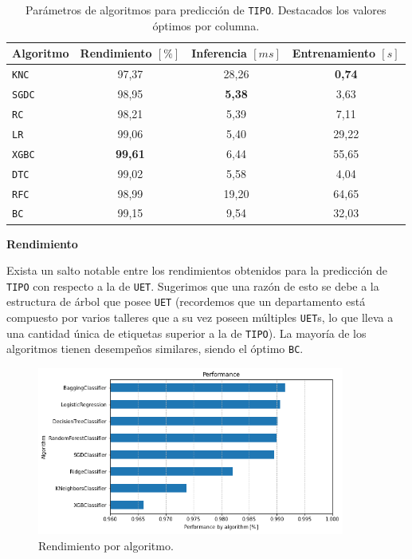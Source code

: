 \documentclass[a4paper,12pt]{article}
\begin{document}
		\begin{table}[H]
			\centering
			\begin{tabular}{lccc}
				\hline
				\multicolumn{1}{c}{\textbf{Algoritmo}} &
				\multicolumn{1}{c}{\textbf{Rendimiento $[\%]$}} &
				\multicolumn{1}{c}{\textbf{Inferencia $[ms]$}} &
				\multicolumn{1}{c}{\textbf{Entrenamiento $[s]$}} \\ 
				\hline
				\texttt{KNC}  & 97,37          & 28,26         & \textbf{0,74} \\
				\texttt{SGDC} & 98,95          & \textbf{5,38} & 3,63          \\
				\texttt{RC}   & 98,21          & 5,39          & 7,11          \\
				\texttt{LR}   & 99,06          & 5,40          & 29,22         \\
				\texttt{XGBC} & \textbf{99,61} & 6,44          & 55,65         \\
				\texttt{DTC}  & 99,02          & 5,58          & 4,04          \\
				\texttt{RFC}  & 98,99          & 19,20         & 64,65         \\
				\texttt{BC}   & 99,15          & 9,54          & 32,03         \\ 
				\hline
			\end{tabular}
			\caption{Parámetros de algoritmos para predicción de \texttt{TIPO}. Destacados los valores óptimos por columna.}
			\label{tab:tipo-parameters-algo}
		\end{table}
		
		\textbf{Rendimiento}
		
		Exista un salto notable entre los rendimientos obtenidos para la predicción de \texttt{TIPO} con respecto a la de \texttt{UET}. Sugerimos que una razón de esto se debe a la estructura de árbol que posee \texttt{UET} (recordemos que un departamento está compuesto por varios talleres que a su vez poseen múltiples \texttt{UET}s, lo que lleva a una cantidad única de etiquetas superior a la de \texttt{TIPO}). La mayoría de los algoritmos tienen desempeños similares, siendo el óptimo \texttt{BC}.
		
		\begin{figure}[H]
			\begin{center}
				\includegraphics[width=0.9\textwidth]{perfo_uet_by_algo.png}
				\caption{Rendimiento por algoritmo.}
				\label{fig:perfo_uet_by_algo}
			\end{center}
		\end{figure}
		
\end{document}
